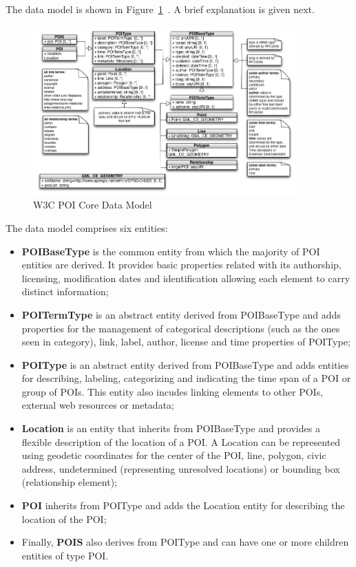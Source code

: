 \documentclass[times,doublespace]{ettauth}%
\begin{document}
The data model is shown in Figure~\ref{fig:data-model}~\cite{w3c-poi}.
A brief explanation is given next.
\begin{figure}
\centering
\includegraphics[width=0.9\textwidth]{images/uml}
\caption{W3C POI Core Data Model}
\label{fig:data-model}
\end{figure}
The data model comprises six entities:
\begin{itemize}
\item \textbf{POIBaseType} is the common entity from which the majority of \ac{POI} entities are derived.
It provides basic properties related with its authorship, licensing, modification dates and identification allowing each element to carry distinct information;
\item \textbf{POITermType} is an abstract entity derived from POIBaseType and adds properties for the management of categorical descriptions (such as the ones seen in category), link, label, author, license and time properties of POIType;
\item \textbf{POIType} is an abstract entity derived from POIBaseType and adds entities for describing, labeling, categorizing and indicating the time span of a \ac{POI} or group of \acp{POI}.
This entity also incudes linking elements to other POIs, external web resources or metadata;
\item \textbf{Location} is an entity that inherits from POIBaseType and provides a flexible description of the location of a \ac{POI}.
A Location can be represented using geodetic coordinates for the center of the POI, line, polygon, civic address, undetermined (representing unresolved locations) or bounding box (relationship element);
\item \textbf{POI} inherits from POIType and adds the Location entity for describing the location of the \ac{POI};
\item Finally, \textbf{POIS} also derives from POIType and can have one or more children entities of type \ac{POI}.
\end{itemize}
\end{document}
